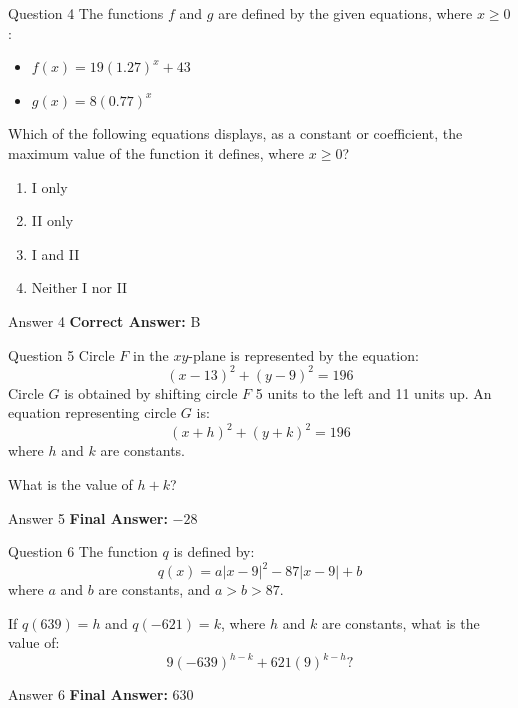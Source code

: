 \documentclass{beamer}
\begin{document}
\begin{frame}{Question 4}
\small
The functions \(f\) and \(g\) are defined by the given equations, where \(x \geq 0\):

\begin{itemize}
\item[I] \(f(x) = 19(1.27)^x + 43\)
\item[II] \(g(x) = 8(0.77)^x\)
\end{itemize}

Which of the following equations displays, as a constant or coefficient, the maximum value of the function it defines, where \(x \geq 0\)?
\vspace{0.35cm}
\begin{enumerate}
    \item[A.] I only
    \item[B.] II only
    \item[C.] I and II
    \item[D.] Neither I nor II
\end{enumerate}
\end{frame}
\begin{frame}{Answer 4}
\small
\textbf{Correct Answer:} B
\end{frame}

\begin{frame}{Question 5}
\small
Circle \(F\) in the \(xy\)-plane is represented by the equation:
\[
(x - 13)^2 + (y - 9)^2 = 196
\]
Circle \(G\) is obtained by shifting circle \(F\) 5 units to the left and 11 units up. An equation representing circle \(G\) is:
\[
(x + h)^2 + (y + k)^2 = 196
\]
where \(h\) and \(k\) are constants.

What is the value of \(h + k\)?
\end{frame}
\begin{frame}{Answer 5}
\small
\textbf{Final Answer:} $\boxed{-28}$
\end{frame}

\begin{frame}{Question 6}
\small
The function \(q\) is defined by:
\[
q(x) = a|x - 9|^2 - 87|x - 9| + b
\]
where \(a\) and \(b\) are constants, and \(a > b > 87\).

If \(q(639) = h\) and \(q(-621) = k\), where \(h\) and \(k\) are constants, what is the value of:
\[
9(-639)^{h-k} + 621(9)^{k-h}?
\]
\end{frame}
\begin{frame}{Answer 6}
\small
\textbf{Final Answer:} $\boxed{630}$
\end{frame}
\end{document}

